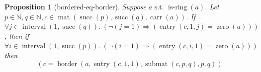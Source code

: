 \documentclass[11pt]{article}
\theoremstyle{plain}
\newtheorem{proposition}{Proposition}
\begin{document}
\begin{proposition}[bordered-eq-border]
Suppose $a \text{ s.t. } \operatorname{is\text{-}ring}(a)$. Let $p \in \mathbb{N}, q \in \mathbb{N}, c \in \operatorname{mat}(\operatorname{succ}(p), \operatorname{succ}(q), \operatorname{carr}(a))$. If $\forall j \in \operatorname{interval}(1, \operatorname{succ}(q)).\; (\neg (j = 1) \Rightarrow (\operatorname{entry}(c, 1, j) = \operatorname{zero}(a)))$, then if $\forall i \in \operatorname{interval}(1, \operatorname{succ}(p)).\; (\neg (i = 1) \Rightarrow (\operatorname{entry}(c, i, 1) = \operatorname{zero}(a)))$ then 
\begin{equation*}
(c = \operatorname{border}(a, \operatorname{entry}(c, 1, 1), \operatorname{submat}(c, p, q), p, q))
\end{equation*}

\end{proposition}
\end{document}
